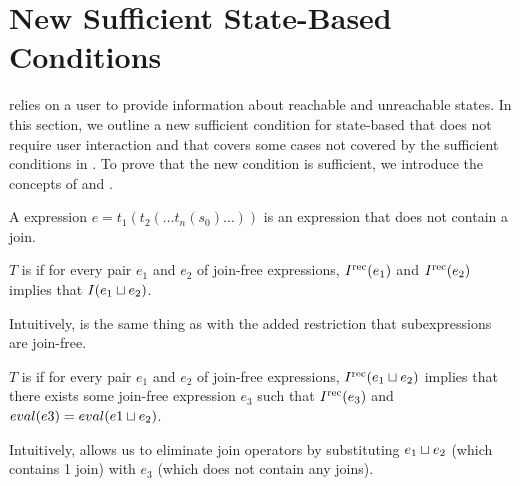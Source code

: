 \section{New Sufficient State-Based Conditions}

 relies on a user to provide information
about reachable and unreachable states. In this section, we outline a new
sufficient condition for state-based \Iconfluence{} that does not require user
interaction and that covers some cases not covered by the sufficient conditions
in . To prove that the new condition is
sufficient, we introduce the concepts of \dIconfluence{} and \dIreduction{}.

\begin{definition}
  A  expression $e = t_1(t_2(\ldots t_n(s_0) \ldots))$ is an
  expression that does not contain a join.
\end{definition}

\begin{definition}
  $T$ is  if for every pair $e_1$ and $e_2$ of
  join-free expressions, $I^{\text{rec}}(e_1)$ and $I^{\text{rec}}(e_2)$ implies that $I(e_1
  \sqcup e_2)$.
\end{definition}

Intuitively, \dIconfluence{} is the same thing as \Iconfluence{} with
the added restriction that subexpressions are join-free.

\begin{definition}
  $T$ is  if for every pair $e_1$ and $e_2$ of
  join-free expressions, $I^{\text{rec}}(e_1 \sqcup e_2)$ implies that there exists some
  join-free expression $e_3$ such that $I^{\text{rec}}(e_3)$ and $eval(e3) = eval(e1
  \sqcup e_2)$.
\end{definition}

Intuitively, \dIreduction{} allows us to eliminate join operators by
substituting $e_1 \sqcup e_2$ (which contains 1 join) with $e_3$ (which does not
contain any joins).

% 
%

